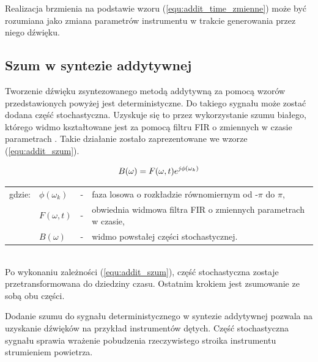 Realizacja brzmienia na podstawie wzoru (\ref{equ:addit_time_zmienne}) może być rozumiana jako zmiana parametrów instrumentu w trakcie generowania przez niego dźwięku.

\subsection{Szum w syntezie addytywnej}
Tworzenie dźwięku zsyntezowanego metodą addytywną za pomocą wzorów przedstawionych powyżej jest deterministyczne. Do takiego sygnału może zostać dodana część stochastyczna. Uzyskuje się to przez wykorzystanie szumu białego, którego widmo kształtowane jest za pomocą filtru FIR o zmiennych w czasie parametrach \cite{add_szum}. Takie działanie zostało zaprezentowane we wzorze (\ref{equ:addit_szum}).

\begin{equation} \label{equ:addit_szum}
B(\omega) = F(\omega, t)e^{j\phi(\omega_{k})} \\  
\end{equation}
\begin{tabular}{ l l l l}
	gdzie: & $\phi(\omega_{k})$ &  - & faza losowa o rozkładzie równomiernym od -$\pi$ do $\pi$, \\
	& $F(\omega, t)$ &  - & obwiednia widmowa filtra FIR o zmiennych parametrach w czasie, \\
	&	$B(\omega)$ & - & widmo powstałej części stochastycznej. \\
\end{tabular} \\

Po wykonaniu zależności (\ref{equ:addit_szum}), część stochastyczna zostaje przetransformowana do dziedziny czasu. Ostatnim krokiem jest zsumowanie ze sobą obu części.

Dodanie szumu do sygnału deterministycznego w syntezie addytywnej pozwala na uzyskanie dźwięków na przykład instrumentów dętych. Część stochastyczna sygnału sprawia wrażenie pobudzenia rzeczywistego stroika instrumentu strumieniem powietrza.



